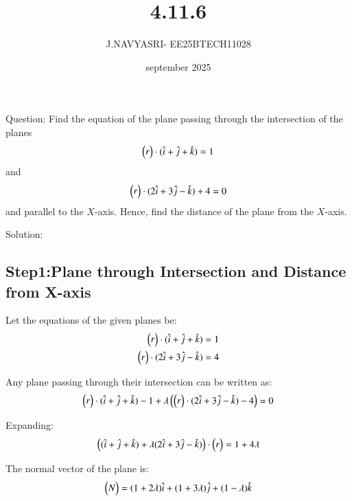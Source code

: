\documentclass{beamer}
\title %
{4.11.6}
\date{september 2025}
\author %
{J.NAVYASRI- EE25BTECH11028}
\begin{document}
\frame{\titlepage}
\begin{frame}{Question:}
Find the equation of the plane passing through the intersection of the planes 
\[
\begin{pmatrix}r\end{pmatrix} \cdot (\hat{i} + \hat{j} + \hat{k}) = 1
\]
and 
\[
\begin{pmatrix}r\end{pmatrix} \cdot (2\hat{i} + 3\hat{j} - \hat{k}) + 4 = 0
\]
and parallel to the $X$-axis. Hence, find the distance of the plane from the $X$-axis.
 
\end{frame}


\begin{frame}{Solution:}
\subsection*{Step1:Plane through Intersection and Distance from X-axis}
Let the equations of the given planes be:
\begin{align}
\begin{pmatrix}r\end{pmatrix} \cdot (\hat{i} + \hat{j} + \hat{k}) &= 1 \label{eq:plane1} \\
\begin{pmatrix}r\end{pmatrix} \cdot (2\hat{i} + 3\hat{j} - \hat{k}) &= 4 \label{eq:plane2}
\end{align}

Any plane passing through their intersection can be written as:
\begin{equation}
\begin{pmatrix}r\end{pmatrix} \cdot (\hat{i} + \hat{j} + \hat{k}) - 1 + \lambda \left(\begin{pmatrix}r\end{pmatrix} \cdot (2\hat{i} + 3\hat{j} - \hat{k}) - 4 \right) = 0
\label{eq:intersect_plane}
\end{equation}

Expanding:
\begin{equation}
\left( (\hat{i} + \hat{j} + \hat{k}) + \lambda (2\hat{i} + 3\hat{j} - \hat{k}) \right) \cdot \begin{pmatrix}r\end{pmatrix} = 1 + 4\lambda
\label{eq:expanded}
\end{equation}

The normal vector of the plane is:
\begin{equation}
\begin{pmatrix}N\end{pmatrix} = (1 + 2\lambda)\hat{i} + (1 + 3\lambda)\hat{j} + (1 - \lambda) \hat{k}
\label{eq:normal}
\end{equation}
\end{frame}
\end{document}
